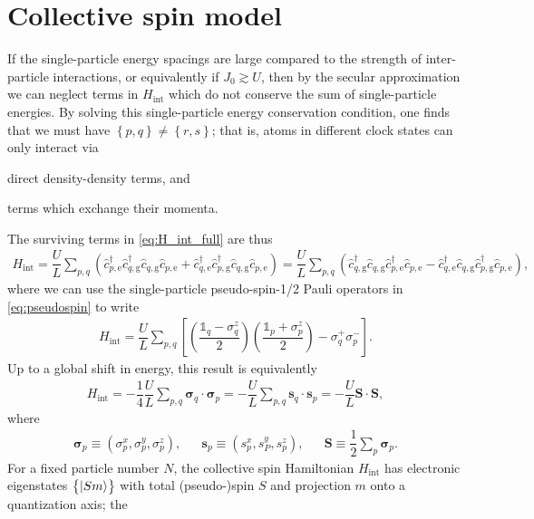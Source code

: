 \documentclass[aps,notitlepage,nofootinbib,11pt]{revtex4-1}
\renewcommand{\t}{\text} %
\newcommand{\f}[2]{\dfrac{#1}{#2}} %
\newcommand{\p}[1]{\left(#1\right)} %
\renewcommand{\sp}[1]{\left[#1\right]} %
\renewcommand{\set}[1]{\left\{#1\right\}} %
\renewcommand{\v}{\bm} %
\renewcommand{\c}{\cdot} %
\newcommand{\g}{\text{g}} %
\newcommand{\e}{\text{e}}
\newcommand{\1}{\mathds{1}}
\begin{document}
\section{Collective spin model}

If the single-particle energy spacings are large compared to the
strength of inter-particle interactions, or equivalently if
$J_0\gtrsim U$, then by the secular approximation we can neglect terms
in $H_{\t{int}}$ which do not conserve the sum of single-particle
energies.  By solving this single-particle energy conservation
condition, one finds that we must have $\set{p,q}\ne\set{r,s}$; that
is, atoms in different clock states can only interact via
\begin{enumerate*}[label=(\roman*)]
\item direct density-density terms, and
\item terms which exchange their momenta.
\end{enumerate*}
The surviving terms in \eqref{eq:H_int_full} are thus
\begin{align}
  H_{\t{int}}
  = \f{U}{L} \sum_{p,q}
  \p{\hat c_{p,\e}^\dag \hat c_{q,\g}^\dag \hat c_{q,\g} \hat c_{p,\e}
    + \hat c_{q,\e}^\dag \hat c_{p,\g}^\dag \hat c_{q,\g} \hat c_{p,\e}}
  = \f{U}{L} \sum_{p,q}
  \p{\hat c_{q,\g}^\dag \hat c_{q,\g} \hat c_{p,\e}^\dag \hat c_{p,\e}
    - \hat c_{q,\e}^\dag \hat c_{q,\g} \hat c_{p,\g}^\dag \hat c_{p,\e}},
\end{align}
where we can use the single-particle pseudo-spin-1/2 Pauli operators
in \eqref{eq:pseudospin} to write
\begin{align}
  H_{\t{int}} = \f{U}{L} \sum_{p,q}
  \sp{\p{\f{\1_q-\sigma_q^z}{2}} \p{\f{\1_p+\sigma_p^z}{2}}
    - \sigma_q^+ \sigma_p^-}.
\end{align}
Up to a global shift in energy, this result is equivalently
\begin{align}
  H_{\t{int}}
  = - \f14 \f{U}{L} \sum_{p,q} \v{\sigma}_q\c\v{\sigma}_p
  = - \f{U}{L} \sum_{p,q} \v s_q \c\v s_p
  = - \f{U}{L} \v S \c \v S,
\end{align}
where
\begin{align}
  \v{\sigma}_p
  \equiv \p{\sigma_p^x,\sigma_p^y,\sigma_p^z},
  &&
  \v s_p \equiv \p{s_p^x,s_P^y,s_p^z},
  &&
  \v S \equiv \f12 \sum_p \v{\sigma}_p.
  \label{eq:H_int}
\end{align}
For a fixed particle number $N$, the collective spin Hamiltonian
$H_{\t{int}}$ has electronic eigenstates $\set{\ket{Sm}}$ with total
(pseudo-)spin $S$ and projection $m$ onto a quantization axis; the
\end{document}
